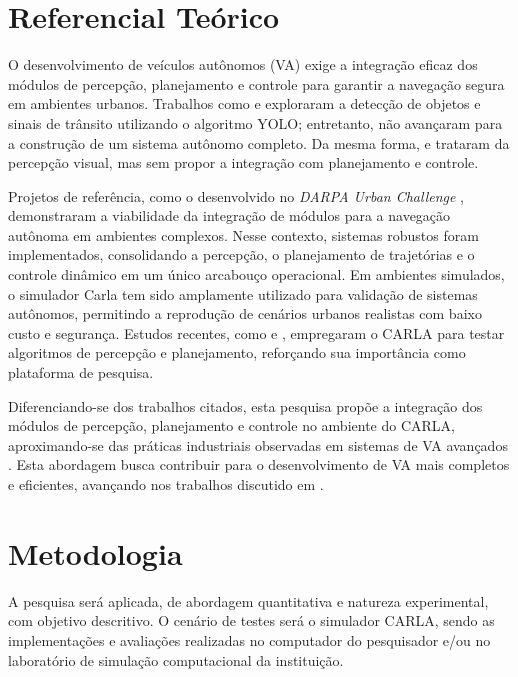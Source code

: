 \documentclass[
	12pt,				%
	oneside, %
	a4paper,			%
	english,			%
	french,				%
	spanish,			%
	brazil				%
	]{abntex2}
\begin{document}
\section{Referencial Teórico}

O desenvolvimento de veículos autônomos (VA) exige a integração eficaz dos módulos de percepção, planejamento e controle para garantir a navegação segura em ambientes urbanos. Trabalhos como  e  exploraram a detecção de objetos e sinais de trânsito utilizando o algoritmo YOLO; entretanto, não avançaram para a construção de um sistema autônomo completo. Da mesma forma,  e  trataram da percepção visual, mas sem propor a integração com planejamento e controle.

Projetos de referência, como o desenvolvido no \textit{DARPA Urban Challenge} \cite{reinholtz2007darpa}, demonstraram a viabilidade da integração de módulos para a navegação autônoma em ambientes complexos. Nesse contexto, sistemas robustos foram implementados, consolidando a percepção, o planejamento de trajetórias e o controle dinâmico em um único arcabouço operacional.
Em ambientes simulados, o simulador Carla \cite{dosovitskiy2017carla} tem sido amplamente utilizado para validação de sistemas autônomos, permitindo a reprodução de cenários urbanos realistas com baixo custo e segurança. Estudos recentes, como  e , empregaram o CARLA para testar algoritmos de percepção e planejamento, reforçando sua importância como plataforma de pesquisa.

Diferenciando-se dos trabalhos citados, esta pesquisa propõe a integração dos módulos de percepção, planejamento e controle no ambiente do CARLA, aproximando-se das práticas industriais observadas em sistemas de VA avançados \cite{University_of_Toronto2018-fe}. Esta abordagem busca contribuir para o desenvolvimento de VA mais completos e eficientes, avançando nos trabalhos discutido em .

\section{Metodologia}

A pesquisa será aplicada, de abordagem quantitativa e natureza experimental, com objetivo descritivo. O cenário de testes será o simulador CARLA, sendo as implementações e avaliações realizadas no computador do pesquisador e/ou no laboratório de simulação computacional da instituição.
\end{document}
